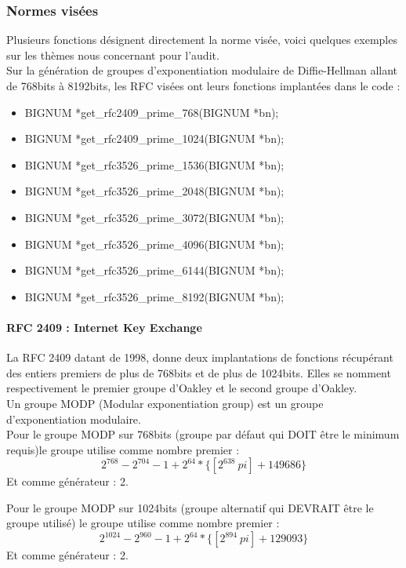 		\subsubsection{Normes visées}

			Plusieurs fonctions désignent directement la norme visée, voici quelques exemples sur les thèmes nous concernant pour l'audit.\\
			Sur la génération de groupes d'exponentiation modulaire de Diffie-Hellman allant de 768bits à 8192bits, les RFC visées  \cite{rfc2409} \cite{rfc3526} ont leurs fonctions implantées dans le code :
			\begin{itemize}
			\item BIGNUM *get\_rfc2409\_prime\_768(BIGNUM *bn);
			\item BIGNUM *get\_rfc2409\_prime\_1024(BIGNUM *bn);
			\item BIGNUM *get\_rfc3526\_prime\_1536(BIGNUM *bn);
			\item BIGNUM *get\_rfc3526\_prime\_2048(BIGNUM *bn);
			\item BIGNUM *get\_rfc3526\_prime\_3072(BIGNUM *bn);
			\item BIGNUM *get\_rfc3526\_prime\_4096(BIGNUM *bn);
			\item BIGNUM *get\_rfc3526\_prime\_6144(BIGNUM *bn);
			\item BIGNUM *get\_rfc3526\_prime\_8192(BIGNUM *bn);
			\end{itemize}

			\paragraph{RFC 2409 : Internet Key Exchange\\}

			La RFC 2409 \cite{rfc2409} datant de 1998, donne deux implantations de fonctions récupérant des entiers premiers de plus de 768bits et de plus de 1024bits. Elles se nomment respectivement le premier groupe d'Oakley et le second groupe d'Oakley.\\

			Un groupe MODP (Modular exponentiation group) est un groupe d'exponentiation modulaire. \\
			
			Pour le groupe MODP sur 768bits (groupe par défaut qui DOIT être le minimum requis)le groupe utilise comme nombre premier : 
			$$ 2^{768} - 2^{704} - 1 + 2^{64} * \{[2^{638}\ pi] + 149686\}$$
			Et comme générateur : 2.

			Pour le groupe MODP sur 1024bits (groupe alternatif qui DEVRAIT être le groupe utilisé) le groupe utilise comme nombre premier :
			$$ 2^{1024} - 2^{960} - 1 + 2^{64} * \{[2^{894}\ pi] + 129093\}$$
			Et comme générateur : 2. 


